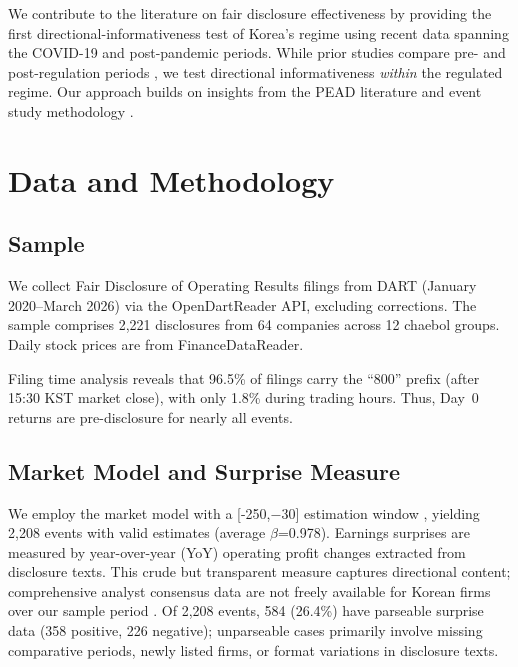 \documentclass[12pt,a4paper]{article}
\begin{document}
We contribute to the literature on fair disclosure effectiveness \citep{heflin2003regulation, bailey2003regulation, eleswarapu2004impact, gomes2007sec} by providing the first directional-informativeness test of Korea's regime using recent data spanning the COVID-19 and post-pandemic periods. While prior studies compare pre- and post-regulation periods \citep{ahmed2003impact, yoon2011impact}, we test directional informativeness \textit{within} the regulated regime. Our approach builds on insights from the PEAD literature \citep{bernard1989post} and event study methodology \citep{brown1985using}.

\section{Data and Methodology}

\subsection{Sample}

We collect Fair Disclosure of Operating Results filings from DART (January 2020--March 2026) via the OpenDartReader API, excluding corrections. The sample comprises 2,221 disclosures from 64 companies across 12 chaebol groups. Daily stock prices are from FinanceDataReader.

Filing time analysis reveals that 96.5\% of filings carry the ``800'' prefix (after 15:30 KST market close), with only 1.8\% during trading hours. Thus, Day~0 returns are pre-disclosure for nearly all events.

\subsection{Market Model and Surprise Measure}

We employ the market model with a [-250,$-$30] estimation window \citep{mackinlay1997event}, yielding 2,208 events with valid estimates (average $\beta$=0.978). Earnings surprises are measured by year-over-year (YoY) operating profit changes extracted from disclosure texts. This crude but transparent measure captures directional content; comprehensive analyst consensus data are not freely available for Korean firms over our sample period \citep{livnat2006comparing}. Of 2,208 events, 584 (26.4\%) have parseable surprise data (358 positive, 226 negative); unparseable cases primarily involve missing comparative periods, newly listed firms, or format variations in disclosure texts.
\end{document}
